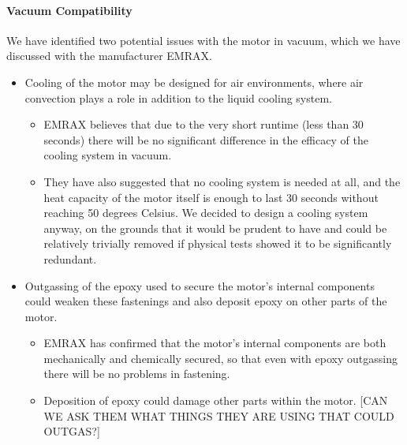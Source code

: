 \documentclass[main.tex]{subfiles}
\begin{document}
    \paragraph{Vacuum Compatibility}
    We have identified two potential issues with the motor in vacuum, which we have discussed with the manufacturer EMRAX.
    \begin{itemize}
        \item Cooling of the motor may be designed for air environments, where air convection plays a role in addition to the liquid cooling system.
        \begin{itemize}
            \item EMRAX believes that due to the very short runtime (less than 30 seconds) there will be no significant difference in the efficacy of the cooling system in vacuum.
            \item They have also suggested that no cooling system is needed at all, and the heat capacity of the motor itself is enough to last 30 seconds without reaching 50 degrees Celsius. We decided to design a cooling system anyway, on the grounds that it would be prudent to have and could be relatively trivially removed if physical tests showed it to be significantly redundant.
        \end{itemize}
        \item Outgassing of the epoxy used to secure the motor’s internal components could weaken these fastenings and also deposit epoxy on other parts of the motor.
        \begin{itemize}
            \item EMRAX has confirmed that the motor’s internal components are both mechanically and chemically secured, so that even with epoxy outgassing there will be no problems in fastening.
            \item Deposition of epoxy could damage other parts within the motor. [CAN WE ASK THEM WHAT THINGS THEY ARE USING THAT COULD OUTGAS?]
        \end{itemize}
    \end{itemize}
\end{document}
